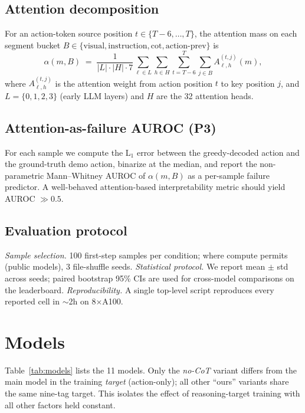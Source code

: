 \documentclass{article}
\begin{document}
\subsection{Attention decomposition}
For an action-token source position $t \in \{T-6, \dots, T\}$, the attention mass on each segment bucket $B \in \{\text{visual}, \text{instruction}, \text{cot}, \text{action-prev}\}$ is
\begin{equation}
\alpha(m, B) \;=\; \frac{1}{|L|\cdot|H|\cdot 7}
\sum_{\ell \in L}\sum_{h \in H}\sum_{t=T-6}^{T}
\sum_{j \in B} A_{\ell,h}^{(t,j)}(m),
\label{eq:attn}
\end{equation}
where $A_{\ell,h}^{(t,j)}$ is the attention weight from action position $t$ to key position $j$, and $L = \{0,1,2,3\}$ (early LLM layers) and $H$ are the 32 attention heads.

\subsection{Attention-as-failure AUROC (P3)}
For each sample we compute the L$_1$ error between the greedy-decoded action and the ground-truth demo action, binarize at the median, and report the non-parametric Mann--Whitney AUROC of $\alpha(m, B)$ as a per-sample failure predictor. A well-behaved attention-based interpretability metric should yield AUROC $\gg 0.5$.

\subsection{Evaluation protocol}
\emph{Sample selection.} 100 first-step samples per condition; where compute permits (public models), 3 file-shuffle seeds. \emph{Statistical protocol.} We report mean $\pm$ std across seeds; paired bootstrap 95\% CIs are used for cross-model comparisons on the leaderboard. \emph{Reproducibility.} A single top-level script reproduces every reported cell in $\sim$2h on 8$\times$A100.

\section{Models}
\label{sec:models}

Table~\ref{tab:models} lists the 11 models. Only the \emph{no-CoT} variant differs from the main model in the training \emph{target} (action-only); all other ``ours'' variants share the same nine-tag target. This isolates the effect of reasoning-target training with all other factors held constant.
\end{document}

